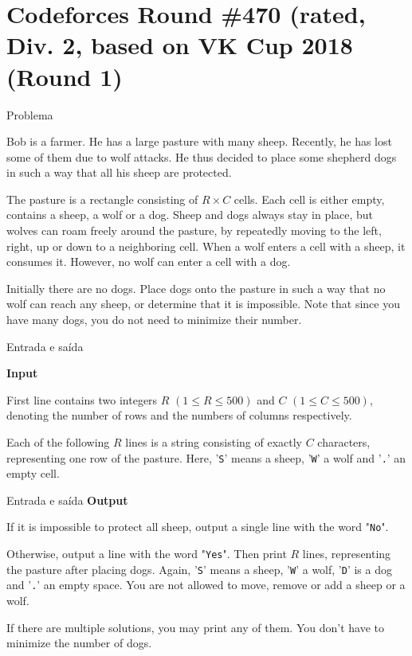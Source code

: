 \section{Codeforces Round \#470 (rated, Div. 2, based on VK Cup 2018 (Round 1)}

\begin{frame}[fragile]{Problema}

Bob is a farmer. He has a large pasture with many sheep. Recently, he has lost some of them due to wolf attacks. He thus decided to place some shepherd dogs in such a way that all his sheep are protected.

The pasture is a rectangle consisting of $R\times C$ cells. Each cell is either empty, contains a sheep, a wolf or a dog. Sheep and dogs always stay in place, but wolves can roam freely around the pasture, by repeatedly moving to the left, right, up or down to a neighboring cell. When a wolf enters a cell with a sheep, it consumes it. However, no wolf can enter a cell with a dog.

Initially there are no dogs. Place dogs onto the pasture in such a way that no wolf can reach any sheep, or determine that it is impossible. Note that since you have many dogs, you do not need to minimize their number.

\end{frame}

\begin{frame}[fragile]{Entrada e saída}

\textbf{Input}

First line contains two integers $R$ $(1\leq R\leq 500)$ and $C$ $(1\leq C\leq 500)$, denoting the 
number of rows and the numbers of columns respectively.

Each of the following $R$ lines is a string consisting of exactly $C$ characters, representing one 
row of the pasture. Here, '\texttt{S}' means a sheep, '\texttt{W}' a wolf and '\texttt{.}' an empty cell.
\end{frame}

\begin{frame}[fragile]{Entrada e saída}
\textbf{Output}

If it is impossible to protect all sheep, output a single line with the word "\texttt{No}".

Otherwise, output a line with the word "\texttt{Yes}". Then print $R$ lines, representing the 
pasture after placing dogs. Again, '\texttt{S}' means a sheep, '\texttt{W}' a wolf, '\texttt{D}' is 
a dog and '\texttt{.}' an empty space. You are not allowed to move, remove or add a sheep or a wolf.

If there are multiple solutions, you may print any of them. You don't have to minimize the number of dogs.

\end{frame}

